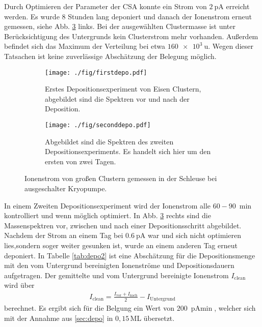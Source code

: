 Durch Optimieren der Parameter der CSA konnte ein Strom von $\SI{2}{\pA}$ erreicht werden.
Es wurde 8 Stunden lang deponiert und danach der Ionenstrom erneut gemessen, siehe Abb. \ref{fig:deposition} links.
Bei der ausgewählten Clustermasse ist unter Berücksichtigung des Untergrunds kein Clusterstrom mehr vorhanden. 
Außerdem befindet sich das Maximum der Verteilung bei etwa $\SI{160e3}{\amu}$.
Wegen dieser Tatsachen ist keine zuverlässige Abschätzung der Belegung möglich.\\
\begin{figure}[h]
  \begin{subfigure}[t]{0.475\textwidth}
    \texttt{[image: ./fig/firstdepo.pdf]}
    \caption{Erstes Depositionsexperiment von Eisen Clustern, abgebildet sind die Spektren vor und nach der Deposition.}
    \label{fig:firstdepo}
  \end{subfigure}\hfill
  \begin{subfigure}[t]{0.475\textwidth}
    \texttt{[image: ./fig/seconddepo.pdf]}
    \caption{Abgebildet sind die Spektren des zweiten Depositionsexperiments. Es handelt sich hier um den ersten von zwei Tagen.}
    \label{fig:seconddepo}
  \end{subfigure}
  \caption{Ionenstrom von großen Clustern gemessen in der Schleuse bei ausgeschalter Kryopumpe.} 
  \label{fig:deposition}
\end{figure}

In einem Zweiten Depositionsexperiment wird der Ionenstrom alle $60 - \SI{90}{\min}$ kontrolliert und wenn möglich optimiert.
In Abb. \ref{fig:deposition} rechts sind die Massenspektren vor, zwischen und nach einer Depositionsschritt abgebildet. 
Nachdem der Strom an einem Tag bei $\SI{0.6}{\pA}$ war und sich nicht optimieren lies,sondern soger weiter gesunken ist, wurde an einem anderen Tag erneut deponiert.
In Tabelle \ref{tab:depo2} ist eine Abschätzung für die Depositionsmenge mit den vom Untergrund bereinigten Ionenströme und Depositionsdauern aufgetragen. Der gemittelte und vom Untergrund bereinigte Ionenstrom $I_{\text{clean}}$ wird über
\begin{align*}
  I_{\text{clean}}=\frac{I_{\text{vor}}+I_{\text{nach}}}{2}-I_{\text{Untergrund}}
\end{align*} 
berechnet. Es ergibt sich für die Belgung ein Wert von $\SI{200}{\pA\min}$, welcher sich mit der Annahme aus \ref{sec:depo} in $0,15\,$ML übersetzt.

